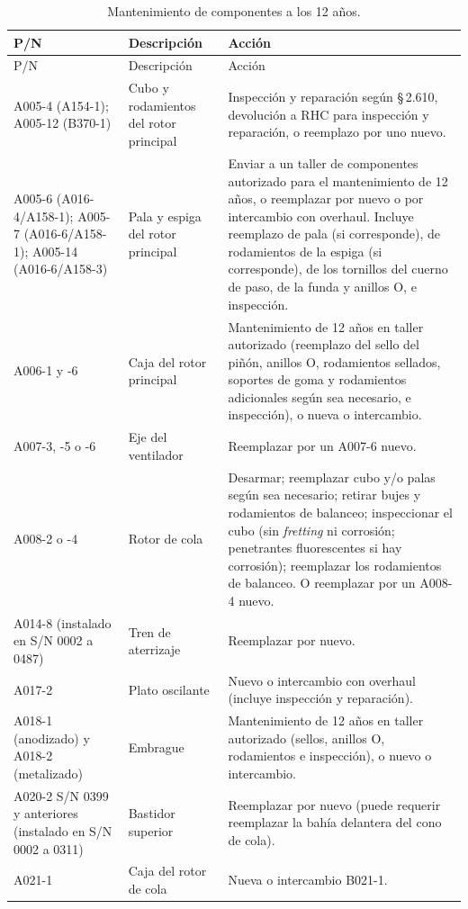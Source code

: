 {\footnotesize
\begin{longtable}{@{}p{2.1cm}p{2.6cm}p{\dimexpr\linewidth-4.7cm-4\tabcolsep}@{}}
\caption{Mantenimiento de componentes a los 12 años.}\\
\toprule
P/N & Descripción & Acción \\
\midrule
\endfirsthead
\toprule
P/N & Descripción & Acción \\
\midrule
\endhead
A005-4 (A154-1); A005-12 (B370-1) & Cubo y rodamientos del rotor principal & Inspección y reparación según \S\,2.610, devolución a RHC para inspección y reparación, o reemplazo por uno nuevo. \\
A005-6 (A016-4/A158-1); A005-7 (A016-6/A158-1); A005-14 (A016-6/A158-3) & Pala y espiga del rotor principal & Enviar a un taller de componentes autorizado para el mantenimiento de 12 años, o reemplazar por nuevo o por intercambio con overhaul. Incluye reemplazo de pala (si corresponde), de rodamientos de la espiga (si corresponde), de los tornillos del cuerno de paso, de la funda y anillos O, e inspección. \\
A006-1 y -6 & Caja del rotor principal & Mantenimiento de 12 años en taller autorizado (reemplazo del sello del piñón, anillos O, rodamientos sellados, soportes de goma y rodamientos adicionales según sea necesario, e inspección), o nueva o intercambio. \\
A007-3, -5 o -6 & Eje del ventilador & Reemplazar por un A007-6 nuevo. \\
A008-2 o -4 & Rotor de cola & Desarmar; reemplazar cubo y/o palas según sea necesario; retirar bujes y rodamientos de balanceo; inspeccionar el cubo (sin \emph{fretting} ni corrosión; penetrantes fluorescentes si hay corrosión); reemplazar los rodamientos de balanceo. O reemplazar por un A008-4 nuevo. \\
A014-8 (instalado en S/N 0002 a 0487) & Tren de aterrizaje & Reemplazar por nuevo. \\
A017-2 & Plato oscilante & Nuevo o intercambio con overhaul (incluye inspección y reparación). \\
A018-1 (anodizado) y A018-2 (metalizado) & Embrague & Mantenimiento de 12 años en taller autorizado (sellos, anillos O, rodamientos e inspección), o nuevo o intercambio. \\
A020-2 S/N 0399 y anteriores (instalado en S/N 0002 a 0311) & Bastidor superior & Reemplazar por nuevo (puede requerir reemplazar la bahía delantera del cono de cola). \\
A021-1 & Caja del rotor de cola & Nueva o intercambio B021-1. \\

\end{longtable}}
